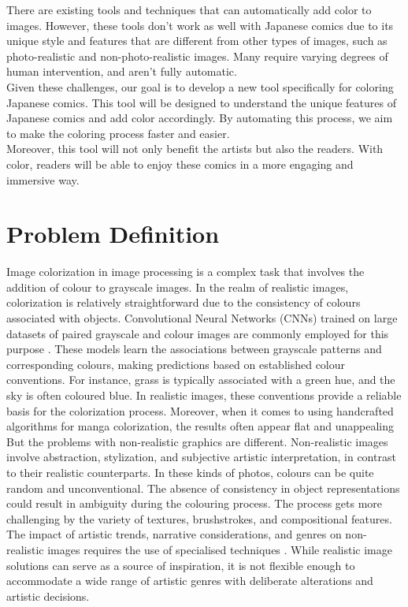 \noindent There are existing tools and techniques that can automatically add color to images. However, these tools don’t work as well with Japanese comics due to its unique style and features that are different from other types of images, such as photo-realistic and non-photo-realistic images. Many require varying degrees of human intervention, and aren't fully automatic. \cite{shimizu2021painting,isola2018imagetoimage, 10.1007/978-3-030-72610-2_17}\\

\noindent Given these challenges, our goal is to develop a new tool specifically for coloring Japanese comics. This tool will be designed to understand the unique features of Japanese comics and add color accordingly. By automating this process, we aim to make the coloring process faster and easier.\\

\noindent Moreover, this tool will not only benefit the artists but also the readers. With color, readers will be able to enjoy these comics in a more engaging and immersive way.\\


\section{Problem Definition}
Image colorization in image processing is a complex task that involves the addition of colour to grayscale images. In the realm of realistic images, colorization is relatively straightforward due to the consistency of colours associated with objects. Convolutional Neural Networks (CNNs) trained on large datasets of paired grayscale and colour images are commonly employed for this purpose \cite{furusawa2017comicolorization, zhu2020unpaired, varga2017convolutional}. These models learn the associations between grayscale patterns and corresponding colours, making predictions based on established colour conventions. For instance, grass is typically associated with a green hue, and the sky is often coloured blue. In realistic images, these conventions provide a reliable basis for the colorization process.  Moreover, when it comes to using handcrafted algorithms for manga colorization, the results often appear flat and unappealing \cite{jiramahapokee2023inkn}\\ 

\noindent But the problems with non-realistic graphics are different. Non-realistic images involve abstraction, stylization, and subjective artistic interpretation, in contrast to their realistic counterparts. In these kinds of photos, colours can be quite random and unconventional. The absence of consistency in object representations could result in ambiguity during the colouring process. The process gets more challenging by the variety of textures, brushstrokes, and compositional features. The impact of artistic trends, narrative considerations, and genres on non-realistic images requires the use of specialised techniques \cite{li-2017-deep}. While realistic image solutions can serve as a source of inspiration, it is not flexible enough to accommodate a wide range of artistic genres with deliberate alterations and artistic decisions. \cite{isola2018imagetoimage}\\

